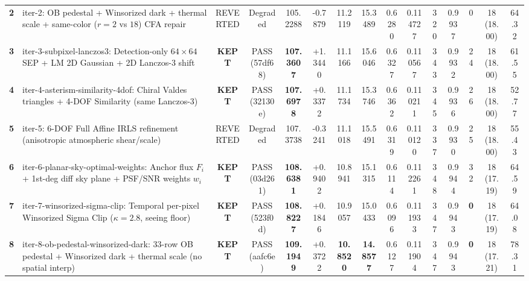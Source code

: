 \documentclass[10pt,twocolumn,letterpaper]{article}
\DeclareRobustCommand{\code}[1]{\texttt{#1}}
\def\code#1{#1}%
\begin{document}
\begin{table}[t]
{\begin{tabular}{clccccccccccccc}
      \textbf{2} & \code{iter-2}: OB pedestal + Winsorized dark + thermal scale + same-color ($r{=}2$ vs $18$) CFA repair & REVERTED & Degraded & \code{105.2288} & \code{-0.7879} & \code{11.2119} & \code{15.3489} & \code{0.6280} & \code{0.114727} & \code{320} & \code{0.9937} & \code{0} & \code{18 (18.00)} & \code{64.32} \\
      \textbf{3} & \code{iter-3-subpixel-lanczos3}: Detection-only $64\times 64$ SEP + LM 2D Gaussian + 2D Lanczos-3 shift & \textbf{KEPT} & \code{PASS (57df68)} & \textbf{\code{107.3607}} & \code{+1.3440} & \code{11.1166} & \code{15.6046} & \code{0.6327} & \code{0.110567} & \code{343} & \code{0.9932} & \code{24} & \code{18 (18.00)} & \code{61.55} \\
      \textbf{4} & \code{iter-4-asterism-similarity-4dof}: Chiral Valdes triangles + 4-DOF Similarity (same Lanczos-3) & \textbf{KEPT} & \code{PASS (32130e)} & \textbf{\code{107.6978}} & \code{+0.3372} & \code{11.1734} & \code{15.3746} & \code{0.6362} & \code{0.110211} & \code{345} & \code{0.9936} & \code{26} & \code{18 (18.00)} & \code{52.77} \\
      \textbf{5} & \code{iter-5}: 6-DOF Full Affine IRLS refinement (anisotropic atmospheric shear/scale) & REVERTED & Degraded & \code{107.3738} & \code{-0.3241} & \code{11.1018} & \code{15.5491} & \code{0.6319} & \code{0.110120} & \code{337} & \code{0.9930} & \code{25} & \code{18 (18.00)} & \code{55.43} \\
      \textbf{6} & \code{iter-6-planar-sky-optimal-weights}: Anchor flux $F_i$ + 1st-deg diff sky plane + PSF/SNR weights $w_i$ & \textbf{KEPT} & \code{PASS (03d261)} & \textbf{\code{108.6381}} & \code{+0.9402} & \code{10.8941} & \code{15.1315} & \code{0.6114} & \code{0.112261} & \code{348} & \code{0.9944} & \code{32} & \code{18 (17.19)} & \code{64.59} \\
      \textbf{7} & \code{iter-7-winsorized-sigma-clip}: Temporal per-pixel Winsorized Sigma Clip ($\kappa{=}2.8$, seeing floor) & \textbf{KEPT} & \code{PASS (523f0d)} & \textbf{\code{108.8227}} & \code{+0.1846} & \code{10.9057} & \code{15.0433} & \code{0.6096} & \code{0.111933} & \code{347} & \code{0.9943} & \textbf{\code{0}} & \code{18 (17.19)} & \code{64.08} \\
      \textbf{8} & \code{iter-8-ob-pedestal-winsorized-dark}: 33-row OB pedestal + Winsorized dark + thermal scale (no spatial interp) & \textbf{KEPT} & \code{PASS (aafc6e)} & \textbf{\code{109.1949}} & \code{+0.3722} & \textbf{\code{10.8520}} & \textbf{\code{14.8577}} & \code{0.6127} & \code{0.111904} & \code{347} & \code{0.9943} & \textbf{\code{0}} & \code{18 (17.21)} & \code{78.31} \\

\end{tabular}}
\end{table}
\end{document}
